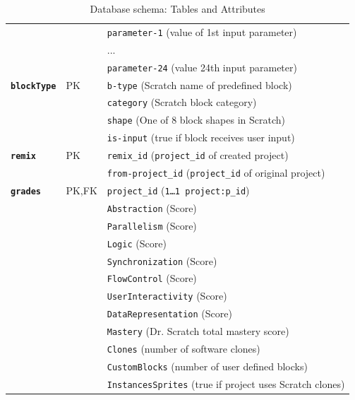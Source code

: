 \documentclass[10pt, conference]{IEEEtran}
\begin{document}
\begin{table}[]
\begin{tabular}{llp{5.4cm}}
		&  & \texttt{parameter-1} (value of 1st input parameter)\\
		&  & ... \\
		&  & \texttt{parameter-24} (value 24th input parameter)\\
		\hline
		\textbf{\texttt{blockType}} & PK & \texttt{b-type} (Scratch name of predefined block)\\
		&  & \texttt{category} (Scratch block category)\\
		&  & \texttt{shape} (One of 8 block shapes in Scratch)\\
		&  & \texttt{is-input} (true if block receives user input)\\
		\hline
		\textbf{\texttt{remix}} & PK  & \texttt{remix\_id} (\texttt{\scriptsize{project\_id}} of created project)\\
		&  & \texttt{from-project\_id} (\texttt{\scriptsize{project\_id}} of original project)\\
		\hline
		\textbf{\texttt{grades}} & PK,FK & \texttt{project\_id} (\texttt{\scriptsize{1\ldots1 project:p\_id}})\\

		& & \texttt{Abstraction} (Score)\\
		& & \texttt{Parallelism} (Score)\\
		& & \texttt{Logic} (Score)\\
		& & \texttt{Synchronization} (Score)\\
		& & \texttt{FlowControl} (Score)\\
		& & \texttt{UserInteractivity} (Score)\\
		& & \texttt{DataRepresentation} (Score)\\
		& & \texttt{Mastery} (Dr. Scratch total mastery score)\\
		& & \texttt{Clones} (number of software clones)\\
		& & \texttt{CustomBlocks} (number of user defined blocks)\\
		& & \texttt{InstancesSprites} (true if project uses Scratch clones)\\
		\hline
	\end{tabular}
	\caption{Database schema: Tables and Attributes}
	\label{tbl-dbschema}
\end{table}
\end{document}
